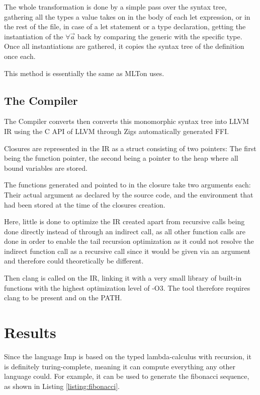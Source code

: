 \documentclass[12pt]{article}
\newcommand{\importListing}[1]{
    \begin{minipage}{\linewidth}
    
    \end{minipage}
}
\begin{document}
The whole transformation is done by a simple pass over the syntax tree, gathering
all the types a value takes on in the body of each let expression,
or in the rest of the file, in case of a let statement or a type declaration,
getting the instantiation of the $\forall\vec{a}$ back by comparing the generic
with the specific type.
Once all instantiations are gathered, it copies the syntax tree of the definition once each.

This method is essentially the same as MLTon uses.\autocite{Monomorphise}

\subsection{The Compiler}
The Compiler converts then converts this
monomorphic syntax tree into LLVM IR using the C API of LLVM through
Zigs automatically generated FFI.

Closures are represented in the IR as a struct consisting of two pointers:
The first being the function pointer, the second being a pointer to the heap
where all bound variables are stored.

The functions generated and pointed to in the closure
take two arguments each: Their actual argument
as declared by the source code, and the environment that had been stored
at the time of the closures creation.

Here, little is done to optimize the IR created apart
from recursive calls being done directly instead of through an indirect
call, as all other function calls are done in order to enable
the tail recursion optimization as it could not resolve the indirect function call
as a recursive call since it would be given via an argument and therefore
could theoretically be different.

Then clang is called on the IR, linking it with a very small library of built-in
functions with the highest optimization level of -O3. The tool therefore requires
clang to be present and on the PATH.

\section{Results}
Since the language Imp is based on the typed lambda-calculus with recursion,
it is definitely turing-complete, meaning it can compute everything any other
language could. For example, it can be used to generate the fibonacci sequence,
as shown in Listing \ref{listing:fibonacci}.

\importListing{code/fibonacci.tex}
\end{document}

